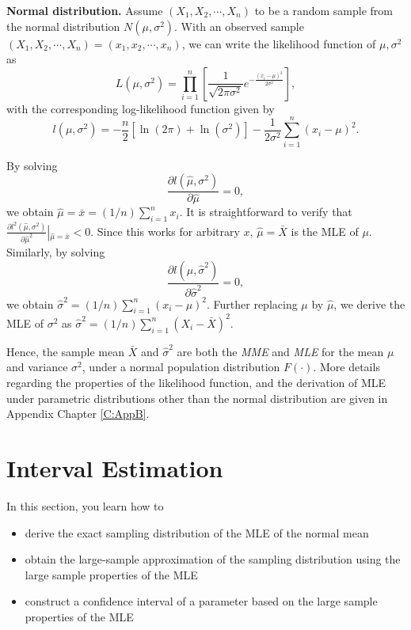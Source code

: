 \documentclass[]{book}
\providecommand{\tightlist}{%
  \setlength{\itemsep}{0pt}\setlength{\parskip}{0pt}}
\theoremstyle{definition}
\theoremstyle{definition}
\theoremstyle{definition}
\theoremstyle{remark}
\begin{document}
\textbf{Normal distribution.} Assume \((X_1,X_2,\cdots,X_n)\) to be a
random sample from the normal distribution \(N(\mu, \sigma^2)\). With an
observed sample \((X_1,X_2,\cdots,X_n)=(x_1,x_2,\cdots,x_n)\), we can
write the likelihood function of \(\mu,\sigma^2\) as
\[L(\mu,\sigma^2)=\prod_{i=1}^n\left[\frac{1}{\sqrt{2\pi\sigma^2}}e^{-\frac{\left(x_i-\mu\right)^2}{2\sigma^2}}\right],\]
with the corresponding log-likelihood function given by
\[l(\mu,\sigma^2)=-\frac{n}{2}[\ln(2\pi)+\ln(\sigma^2)]-\frac{1}{2\sigma^2}\sum_{i=1}^n\left(x_i-\mu\right)^2.\]

By solving
\[\frac{\partial l(\hat{\mu},\sigma^2)}{\partial \hat{\mu}}=0,\] we
obtain \(\hat{\mu}=\bar{x}=(1/n)\sum_{i=1}^nx_i\). It is straightforward
to verify that
\(\frac{\partial l^2(\hat{\mu},\sigma^2)}{\partial \hat{\mu}^2}\left|_{\hat{\mu}=\bar{x}}\right.<0\).
Since this works for arbitrary \(x\), \(\hat{\mu}=\bar{X}\) is the MLE
of \(\mu\). Similarly, by solving
\[\frac{\partial l(\mu,\hat{\sigma}^2)}{\partial \hat{\sigma}^2}=0,\] we
obtain \(\hat{\sigma}^2=(1/n)\sum_{i=1}^n(x_i-\mu)^2\). Further
replacing \(\mu\) by \(\hat{\mu}\), we derive the MLE of \(\sigma^2\) as
\(\hat{\sigma}^2=(1/n)\sum_{i=1}^n(X_i-\bar{X})^2\).

Hence, the sample mean \(\bar{X}\) and \(\hat{\sigma}^2\) are both the
\emph{MME} and \emph{MLE} for the mean \(\mu\) and variance
\(\sigma^2\), under a normal population distribution \(F(\cdot)\). More
details regarding the properties of the likelihood function, and the
derivation of MLE under parametric distributions other than the normal
distribution are given in Appendix Chapter \ref{C:AppB}.

\section{Interval Estimation}\label{S:AppA:IE}

In this section, you learn how to

\begin{itemize}
\tightlist
\item
  derive the exact sampling distribution of the MLE of the normal mean
\item
  obtain the large-sample approximation of the sampling distribution
  using the large sample properties of the MLE
\item
  construct a confidence interval of a parameter based on the large
  sample properties of the MLE
\end{itemize}
\end{document}
